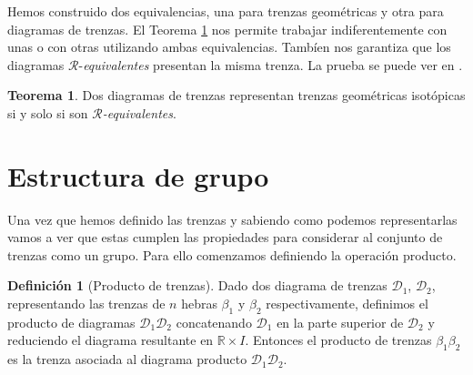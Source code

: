 \documentclass[12pt]{book}
\theoremstyle{definition}
\newtheorem{defi}{Definición}[section]
\newtheorem{teor}{Teorema}[section]
\begin{document}
Hemos construido dos equivalencias, una para trenzas geométricas y otra para diagramas de trenzas. El Teorema \ref{teor:equiv} nos permite trabajar indiferentemente con unas o con otras utilizando ambas equivalencias. Tambíen nos garantiza que los diagramas $\mathcal{R}$-\textit{equivalentes} presentan la misma trenza. La prueba se puede ver en \cite{br_gr}.


\begin{teor}
Dos diagramas de trenzas representan trenzas geométricas isotópicas si y solo si son $\mathcal{R}$\textit{-equivalentes}.
\label{teor:equiv}
\end{teor}




\section{Estructura de grupo}

Una vez que hemos definido las trenzas y sabiendo como podemos representarlas vamos a ver que estas cumplen las propiedades para considerar al conjunto de trenzas como un grupo. Para ello comenzamos definiendo la operación producto.

\begin{defi}[Producto de trenzas]
Dado dos diagrama de trenzas $\mathcal{D}_1$, $\mathcal{D}_2$, representando las trenzas de $n$ hebras $\beta_1$ y $\beta_2$ respectivamente, definimos el producto de diagramas $\mathcal{D}_1\mathcal{D}_2$ concatenando $\mathcal{D}_1$ en la parte superior de $\mathcal{D}_2$ y reduciendo el diagrama resultante en $\mathbb{R}\times I$. Entonces el producto de trenzas $\beta_1\beta_2$ es la trenza  asociada al diagrama producto $\mathcal{D}_1\mathcal{D}_2$.

\end{defi} 
\end{document}
